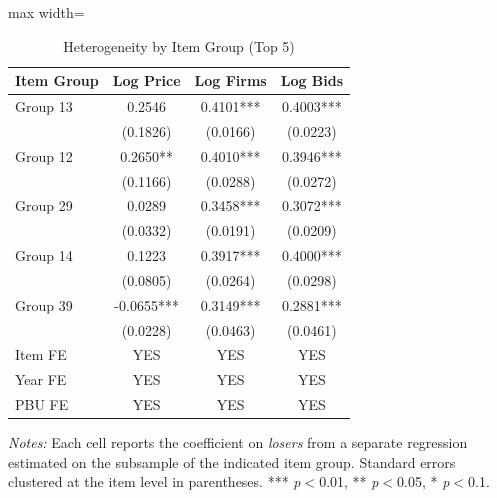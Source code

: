 \begin{table}[htbp]
\centering
\caption{Heterogeneity by Item Group (Top 5)}
\label{tab:heterogeneity_itemgroup}
\begin{adjustbox}{max width=\textwidth}
\begin{threeparttable}
\small
\begin{tabular}{lccc}
\toprule
Item Group & Log Price & Log Firms & Log Bids \\
\midrule
Group 13 & 0.2546 & 0.4101*** & 0.4003*** \\
 & (0.1826) & (0.0166) & (0.0223) \\
Group 12 & 0.2650** & 0.4010*** & 0.3946*** \\
 & (0.1166) & (0.0288) & (0.0272) \\
Group 29 & 0.0289 & 0.3458*** & 0.3072*** \\
 & (0.0332) & (0.0191) & (0.0209) \\
Group 14 & 0.1223 & 0.3917*** & 0.4000*** \\
 & (0.0805) & (0.0264) & (0.0298) \\
Group 39 & -0.0655*** & 0.3149*** & 0.2881*** \\
 & (0.0228) & (0.0463) & (0.0461) \\
\midrule
Item FE & YES & YES & YES \\
Year FE & YES & YES & YES \\
PBU FE & YES & YES & YES \\
\bottomrule
\end{tabular}
\begin{tablenotes}
\small
\item \textit{Notes:} Each cell reports the coefficient on \textit{losers}
from a separate regression estimated on the subsample of the indicated item group.
Standard errors clustered at the item level in parentheses.
*** \textit{p}$<$0.01, ** \textit{p}$<$0.05, * \textit{p}$<$0.1.
\end{tablenotes}
\end{threeparttable}
\end{adjustbox}
\end{table}
